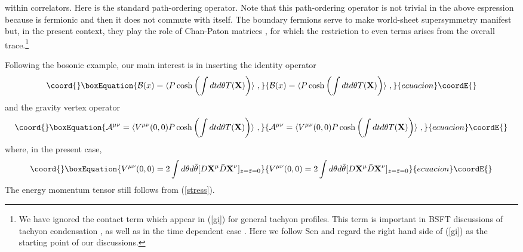 \documentclass[a4paper,12pt]{article}
\begin{document}
within correlators. 
Here \coordHE{} is the standard path-ordering operator.
Note that 
this path-ordering operator is not trivial in the above espression
because \coordHE{} is fermionic 
and then it does not commute with itself.
The boundary fermions serve to make world-sheet supersymmetry 
manifest but, in the present context, they play the role of Chan-Paton matrices \coordHE{}, 
for which the restriction to even terms arises from the overall trace.\footnote{
We have ignored the contact term \coordHE{} which appear in 
(\ref{gi}) for general tachyon profiles. This term is important in BSFT discussions
of tachyon condensation \cite{Gerasimov:2000zp}, as well as in the time dependent 
case \cite{tmbsft}. Here we follow Sen \cite{Sen2} and regard the right hand side of 
(\ref{gi}) as the starting point of our discussions. }

 
Following the bosonic example, our main interest is in inserting the identity operator
\begin{equation}\coord{}\boxEquation{
{\cal B}(x) = \langle P \cosh\left( \int dt d\theta T({\bf X})\right) \rangle~,
\label{susyB}
}{
{\cal B}(x) = \langle P \cosh\left( \int dt d\theta T({\bf X})\right) \rangle~,
}{ecuacion}\coordE{}\end{equation}
and the gravity vertex operator
\begin{equation}\coord{}\boxEquation{
{\cal A}^{\mu\nu} = \langle V^{\mu\nu}(0,0) P \cosh\left( \int dt d\theta T({\bf X})\right) \rangle~,
\label{susyA}
}{
{\cal A}^{\mu\nu} = \langle V^{\mu\nu}(0,0) P \cosh\left( \int dt d\theta T({\bf X})\right) \rangle~,
}{ecuacion}\coordE{}\end{equation}
where, in the present case,
\begin{equation}\coord{}\boxEquation{
V^{\mu\nu}(0,0) = 2 \int d\theta d\bar{\theta}
[D{\bf X}^\mu {\bar D}{\bf X}^\nu ]_{z=\bar{z}=0}
}{
V^{\mu\nu}(0,0) = 2 \int d\theta d\bar{\theta}
[D{\bf X}^\mu {\bar D}{\bf X}^\nu ]_{z=\bar{z}=0}
}{ecuacion}\coordE{}\end{equation}
The energy momentum tensor still follows from (\ref{stress}).
\end{document}

